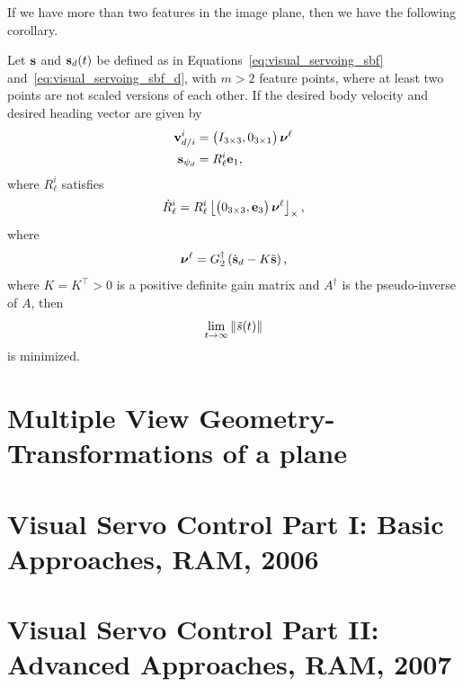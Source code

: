 If we have more than two features in the image plane, then we have the following corollary.
\begin{corollary}
	Let $\mathbf{s}$ and $\mathbf{s}_d(t)$ be defined as in Equations~\eqref{eq:visual_servoing_sbf} and~\eqref{eq:visual_servoing_sbf_d}, with $m>2$ feature points, where at least two points are not scaled versions of each other.  If the desired body velocity and desired heading vector are given by
	\begin{align*}
	\mathbf{v}_{d/i}^i &= \begin{pmatrix} I_{3\times 3}, 0_{3\times 1} \end{pmatrix} \boldsymbol{\nu}^\ell \\
	\mathbf{s}_{\psi_d} &= R_\ell^i \mathbf{e}_1,
	\end{align*}
	where $R_\ell^i$ satisfies
	\[
	\dot{R}_\ell^i = R_\ell^i \left\lfloor \begin{pmatrix} 0_{3\times 3}, \mathbf{e}_3 \end{pmatrix}\boldsymbol{\nu}^\ell\right\rfloor_{\times},
	\]
	where
	\[
	\boldsymbol{\nu}^\ell = G_2^{\dagger}\left(\dot{\mathbf{s}}_d - K \tilde{\mathbf{s}}\right),
	\]
	where $K=K^\top>0$ is a positive definite gain matrix and $A^\dagger$ is the pseudo-inverse of $A$, then 
	\[
	\lim_{t\to\infty}\left\|\tilde{s}(t)\right\|
	\]
	is minimized.
\end{corollary}

\section{Multiple View Geometry-Transformations of a plane}


\section{Visual Servo Control Part I: Basic Approaches, RAM, 2006}


\section{Visual Servo Control Part II: Advanced Approaches, RAM, 2007}


